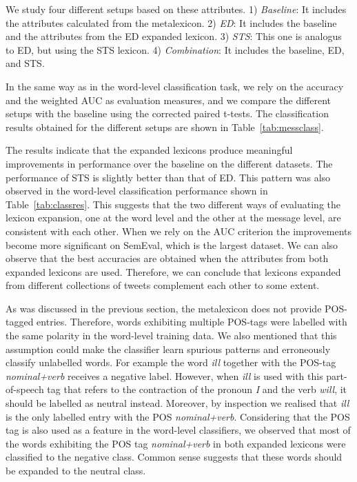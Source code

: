 \documentclass{sig-alternate}
\begin{document}



We study four different setups based on these attributes. 1) \emph{Baseline}: It includes the attributes calculated from the metalexicon.  2) \emph{ED}: It includes the baseline and the attributes from the ED expanded lexicon. 3) \emph{STS}: This one is analogus to ED, but using the STS lexicon. 4) \emph{Combination}: It includes the baseline, ED, and STS.

In the same way as in the word-level classification task, we rely on the accuracy and the weighted AUC as evaluation measures, and we compare the different setups with the baseline using the corrected paired t-tests. The classification results obtained for the different setups are shown in Table~\ref{tab:messclass}.


The results indicate that the expanded lexicons produce meaningful improvements in performance over the baseline on the different datasets. The performance of STS is slightly better than that of ED. This pattern was also observed in the word-level classification performance shown in Table~\ref{tab:classres}. This suggests that the two different ways of evaluating the lexicon expansion, one at the word level and the other at the message level, are consistent with each other. When we rely on the AUC criterion the improvements become more significant on SemEval, which is the largest dataset. We can also observe that the best accuracies are obtained when the attributes from both expanded lexicons are used. Therefore, we can conclude that lexicons expanded from different collections of tweets complement each other to some extent.  



As was discussed in the previous section, the metalexicon does not provide POS-tagged entries. Therefore, words exhibiting  multiple POS-tags were labelled with the same polarity in the word-level training data. We also mentioned that this assumption could make the classifier learn spurious patterns and erroneously classify unlabelled words. For example the word \emph{ill} together with the POS-tag \emph{nominal+verb} receives a negative label. However, when \emph{ill} is used with this part-of-speech tag that refers to the contraction of the pronoun \emph{I} and the verb \emph{will}, it should be labelled as neutral instead. Moreover, by inspection we realised that \emph{ill} is the only labelled entry with the POS \emph{nominal+verb}. Considering that the POS tag is also used as a feature in the word-level classifiers, we observed that most of the words exhibiting the POS tag \emph{nominal+verb} in both expanded lexicons were classified to the negative class. Common sense suggests that these words should be expanded to the neutral class.
\end{document}
